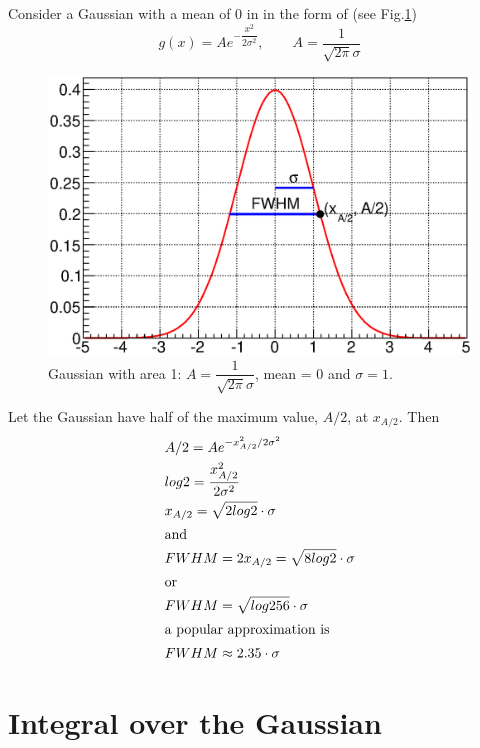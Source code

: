 \documentclass[english]{article}
\makeatletter
\def\ScaleIfNeeded{%
\ifdim\Gin@nat@width>\linewidth
\linewidth
\else
\Gin@nat@width
\fi
}
\makeatother
\begin{document}
Consider a Gaussian with a mean of 0 in in the form of (see Fig.\ref{fig:fgaus}) 
$$
g(x) = Ae^{-\dfrac{x^2}{2\sigma^2}}, \qquad A = \dfrac{1}{\sqrt{2\pi}\sigma}
$$

\begin{figure}[h]
\centering
\begin{minipage}[t]{1.0 \linewidth}
\includegraphics[width=\ScaleIfNeeded]{fgaus.eps}
\caption{Gaussian with area 1: $A = \dfrac{1}{\sqrt{2\pi}\sigma}$, mean = 0 and $\sigma=1$.}
\label{fig:fgaus}
\end{minipage}
\end{figure}

Let the Gaussian have half of the maximum value, $A/2$, at $x_{A/2}$. Then
\begin{align*}
& A/2 = Ae^{-x_{A/2}^2/2\sigma^2} \\
& log2 = \frac{x_{A/2}^2}{2\sigma^2} \\
& x_{A/2} = \sqrt{2 log 2} \cdot \sigma \\
\intertext{and}
& FWHM = 2x_{A/2} = \sqrt{8 log 2} \cdot \sigma \\
\intertext{or}
& FWHM = \sqrt{log 256} \cdot \sigma \\
\intertext{a popular approximation is}
& FWHM \approx 2.35 \cdot \sigma
\end{align*}

\section{Integral over the Gaussian}
\end{document}
